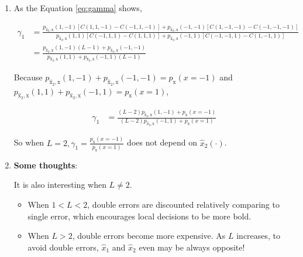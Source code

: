 \documentclass[a4paper]{article}
\begin{document}
\begin{enumerate}
\begin{enumerate}
\item As the Equation \ref{eq:gamma} shows, 

\begin{equation}\label{eq:gamma}
  \begin{aligned}
    \gamma_1 & = \frac { p_{\hat{\mathrm{x}}_2,\mathrm{x}} (1,-1)\left[C(1,1,-1)-C(-1,1,-1) \right] + p_{\hat{\mathrm{x}}_2,\mathrm{x}} (-1,-1)\left[C(1,-1,-1)-C(-1,-1,-1) \right]}{  p_{\hat{\mathrm{x}}_2,\mathrm{x}} (1,1)\left[C(-1,1,1)-C(1,1,1) \right]+ p_{\hat{\mathrm{x}}_2,\mathrm{x}} (-1,1)\left[C(-1,-1,1)-C(1,-1,1) \right]}  \\
    & = \frac { p_{\hat{\mathrm{x}}_2,\mathrm{x}} (1,-1)(L-1) + p_{\hat{\mathrm{x}}_2,\mathrm{x}} (-1,-1)}{  p_{\hat{\mathrm{x}}_2,\mathrm{x}}(1,1) + p_{\hat{\mathrm{x}}_2,\mathrm{x}} (-1,1)(L-1)}
  \end{aligned}
\end{equation}

Because $ p_{\hat{\mathrm{x}}_2,\mathrm{x}} (1,-1) +p_{\hat{\mathrm{x}}_2,\mathrm{x}} (-1,-1)  = p_{\mathrm{x}}(x=-1)$ and $ p_{\hat{\mathrm{x}}_2,\mathrm{x}} (1,1) +p_{\hat{\mathrm{x}}_2,\mathrm{x}} (-1,1)  = p_{\mathrm{x}}(x=1)$,

\begin{equation}\label{eq:gamma}
  \begin{aligned}
    \gamma_1  & = \frac { (L-2)p_{\hat{\mathrm{x}}_2,\mathrm{x}} (1,-1) + p_{\mathrm{x}}(x=-1)}{ (L-2) p_{\hat{\mathrm{x}}_2,\mathrm{x}}(-1,1) +p_{\mathrm{x}}(x=1)}
  \end{aligned}
\end{equation}


So when $L=2,\gamma_1 = \frac {p_{\mathrm{x}}(x=-1)}{p_{\mathrm{x}}(x=1)}$ does not depend on $\hat x_2(\cdot)$.

\item \textbf{Some thoughts}: 

It is also interesting when $L\neq 2$.

\begin{itemize}
  \item When $1<L<2$, double errors are discounted relatively comparing to single error, which encourages local decisions to be more bold.
  \item When $L>2$, double errors become more expensive. As $L$ increases, to avoid double errors, $\hat x_1$ and $\hat x_2$ even may be always opposite!
\end{itemize}

\end{enumerate}



\end{enumerate}
\end{document}
